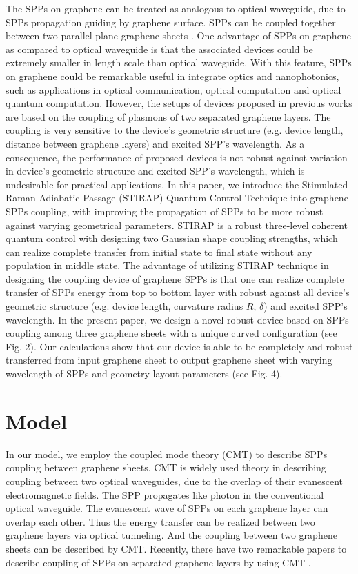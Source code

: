 \documentclass[preprint,12pt,numbers,sort&compress]{elsarticle}
\begin{document}
The SPPs on graphene can be treated as analogous to optical waveguide, due to SPPs propagation guiding by graphene surface.
SPPs can be coupled together between two parallel plane graphene sheets \cite{Wang12,Wang122,Jiang16}.
One advantage of SPPs on graphene as compared to optical waveguide is that the associated devices could be extremely smaller in length scale than optical waveguide.
With this feature, SPPs on graphene could be remarkable useful in integrate optics and nanophotonics, such as applications in optical communication, optical computation and optical quantum computation.
However, the setups of devices proposed in previous works \cite{Wang12, Christensen11, Abajo14} are based on the coupling of plasmons of two separated graphene layers. The coupling is very sensitive to the device's geometric structure (e.g. device length, distance between graphene layers) and excited SPP's wavelength. As a consequence, the performance of proposed devices is not robust against variation in device's geometric structure and excited SPP's wavelength, which is undesirable for practical applications.
In this paper, we introduce the Stimulated Raman Adiabatic Passage (STIRAP) Quantum Control Technique \cite{Vitanov01, Vitanov17, Huang17} into graphene SPPs coupling, with improving the propagation of SPPs to be more robust against varying geometrical parameters.
STIRAP is a robust three-level coherent quantum control with designing two Gaussian shape coupling strengths, which can realize complete transfer from initial state to final state without any population in middle state.
The advantage of utilizing STIRAP technique in designing the coupling device of graphene SPPs is that one can realize complete transfer of SPPs energy from top to bottom layer with robust against all device's geometric structure (e.g. device length, curvature radius $R$, $\delta$) and excited SPP's wavelength.
In the present paper, we design a novel robust device based on SPPs coupling among three graphene sheets with a unique curved configuration (see Fig. 2).
Our calculations show that our device is able to be completely and robust transferred from input graphene sheet to output graphene sheet with varying wavelength of SPPs and geometry layout parameters (see Fig. 4).

\section{Model}
In our model, we employ the coupled mode theory (CMT) to describe SPPs coupling between graphene sheets.
CMT is widely used theory in describing coupling between two optical waveguides, due to the overlap of their evanescent electromagnetic fields. 
The SPP propagates like photon in the conventional optical waveguide. The evanescent wave of SPPs on each graphene layer can overlap each other. Thus the energy transfer can be realized between two graphene layers via optical tunneling. And the coupling between two graphene sheets can be described by CMT. Recently, there have two remarkable papers to describe coupling of SPPs on separated graphene layers by using CMT \cite{Wang12,Wang122}.
\end{document}
